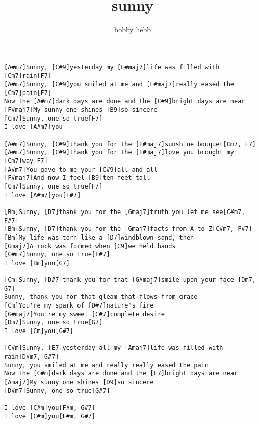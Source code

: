 \author{bobby hebb}
\title{sunny}
\maketitle
\begin{verbatim}
[A#m7]Sunny, [C#9]yesterday my [F#maj7]life was filled with [Cm7]rain[F7]
[A#m7]Sunny, [C#9]you smiled at me and [F#maj7]really eased the [Cm7]pain[F7]
Now the [A#m7]dark days are done and the [C#9]bright days are near
[F#maj7]My sunny one shines [B9]so sincere
[Cm7]Sunny, one so true[F7]
I love [A#m7]you

[A#m7]Sunny, [C#9]thank you for the [F#maj7]sunshine bouquet[Cm7, F7]
[A#m7]Sunny, [C#9]thank you for the [F#maj7]love you brought my [Cm7]way[F7]
[A#m7]You gave to me your [C#9]all and all
[F#maj7]And now I feel [B9]ten feet tall
[Cm7]Sunny, one so true[F7]
I love [A#m7]you[F#7]

[Bm]Sunny, [D7]thank you for the [Gmaj7]truth you let me see[C#m7, F#7]
[Bm]Sunny, [D7]thank you for the [Gmaj7]facts from A to Z[C#m7, F#7]
[Bm]My life was torn like-a [D7]windblown sand, then
[Gmaj7]A rock was formed when [C9]we held hands
[C#m7]Sunny, one so true[F#7]
I love [Bm]you[G7]

[Cm]Sunny, [D#7]thank you for that [G#maj7]smile upon your face [Dm7, G7]
Sunny, thank you for that gleam that flows from grace
[Cm]You're my spark of [D#7]nature's fire
[G#maj7]You're my sweet [C#7]complete desire
[Dm7]Sunny, one so true[G7]
I love [Cm]you[G#7]

[C#m]Sunny, [E7]yesterday all my [Amaj7]life was filled with rain[D#m7, G#7]
Sunny, you smiled at me and really really eased the pain
Now the [C#m]dark days are done and the [E7]bright days are near
[Amaj7]My sunny one shines [D9]so sincere
[D#m7]Sunny, one so true[G#7]
              
I love [C#m]you[F#m, G#7]
I love [C#m]you[F#m, G#7]
\end{verbatim}